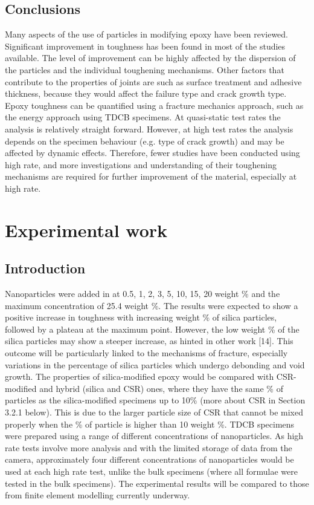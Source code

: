 \documentclass[numbers=noendperiod,chapterprefix=on]{icldt} %
\begin{document}
\section{Conclusions}
Many aspects of the use of particles in modifying epoxy have been reviewed. Significant improvement in toughness has been found in most of the studies available. The level of improvement can be highly affected by the dispersion of the particles and the individual toughening mechanisms. Other factors that contribute to the properties of joints are such as surface treatment and adhesive thickness, because they would affect the failure type and crack growth type.
Epoxy toughness can be quantified using a fracture mechanics approach, such as the energy approach using TDCB specimens. At quasi-static test rates the analysis is relatively straight forward. However, at high test rates the analysis depends on the specimen behaviour (e.g. type of crack growth) and may be affected by dynamic effects.
Therefore, fewer studies have been conducted using high rate, and more investigations and understanding of their toughening mechanisms are required for further improvement of the material, especially at high rate.

\chapter{Experimental work}
\section{Introduction}
Nanoparticles were added in at 0.5, 1, 2, 3, 5, 10, 15, 20 weight \% and the maximum concentration of 25.4 weight \%. The results were expected to show a positive increase in toughness with increasing weight \% of silica particles, followed by a plateau at the maximum point. However, the low weight \% of the silica particles may show a steeper increase, as hinted in other work [14]. This outcome will be particularly linked to the mechanisms of fracture, especially variations in the percentage of silica particles which undergo debonding and void growth. The properties of silica-modified epoxy would be compared with CSR-modified and hybrid (silica and CSR) ones, where they have the same \% of particles as the silica-modified specimens up to 10\% (more about CSR in Section 3.2.1 below). This is due to the larger particle size of CSR that cannot be mixed properly when the \% of particle is higher than 10 weight \%.
TDCB specimens were prepared using a range of different concentrations of nanoparticles. As high rate tests involve more analysis and with the limited storage of data from the camera, approximately four different concentrations of nanoparticles would be used at each high rate test, unlike the bulk specimens (where all formulae were tested in the bulk specimens).
The experimental results will be compared to those from finite element modelling currently underway.
\end{document}
